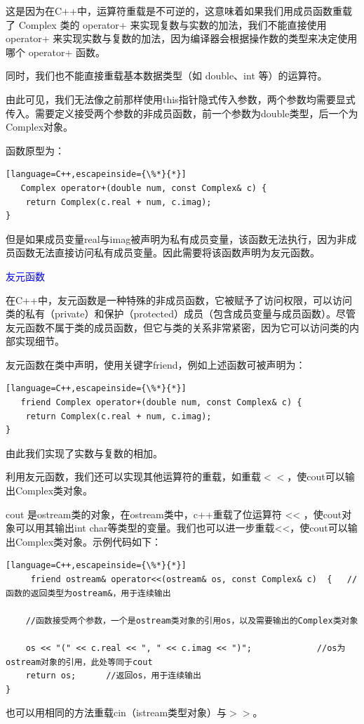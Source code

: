 \documentclass[UTF8]{ctexart}
\begin{document}
这是因为在C++中，运算符重载是不可逆的，这意味着如果我们用成员函数重载了 Complex 类的 operator+ 来实现复数与实数的加法，我们不能直接使用 operator+ 来实现实数与复数的加法，因为编译器会根据操作数的类型来决定使用哪个 operator+ 函数。

同时，我们也不能直接重载基本数据类型（如 double、int 等）的运算符。

由此可见，我们无法像之前那样使用this指针隐式传入参数，两个参数均需要显式传入。需要定义接受两个参数的非成员函数，前一个参数为double类型，后一个为Complex对象。

函数原型为：
\begin{lstlisting}[language=C++,escapeinside={\%*}{*}]
   Complex operator+(double num, const Complex& c) {
	return Complex(c.real + num, c.imag); 
}
\end{lstlisting}
但是如果成员变量real与imag被声明为私有成员变量，该函数无法执行，因为非成员函数无法直接访问私有成员变量。因此需要将该函数声明为友元函数。

\textcolor{blue}{友元函数}

在C++中，友元函数是一种特殊的非成员函数，它被赋予了访问权限，可以访问类的私有（private）和保护（protected）成员（包含成员变量与成员函数）。尽管友元函数不属于类的成员函数，但它与类的关系非常紧密，因为它可以访问类的内部实现细节。

友元函数在类中声明，使用关键字friend，例如上述函数可被声明为：
\begin{lstlisting}[language=C++,escapeinside={\%*}{*}]
   friend Complex operator+(double num, const Complex& c) {
	return Complex(c.real + num, c.imag); 
}
\end{lstlisting}
由此我们实现了实数与复数的相加。

利用友元函数，我们还可以实现其他运算符的重载，如重载$<<$，使cout可以输出Complex类对象。

cout 是ostream类的对象，在ostream类中，c++重载了位运算符 << ，使cout对象可以用其输出int char等类型的变量。我们也可以进一步重载<<，使cout可以输出Complex类对象。示例代码如下：
\begin{lstlisting}[language=C++,escapeinside={\%*}{*}]
     friend ostream& operator<<(ostream& os, const Complex& c) 	{ 	//函数的返回类型为ostream&，用于连续输出
	
	//函数接受两个参数，一个是ostream类对象的引用os，以及需要输出的Complex类对象
	
	os << "(" << c.real << ", " << c.imag << ")"; 			  //os为ostream对象的引用，此处等同于cout
	return os;  	//返回os，用于连续输出
}
\end{lstlisting}
也可以用相同的方法重载cin（istream类型对象）与$>>$。
\end{document}
